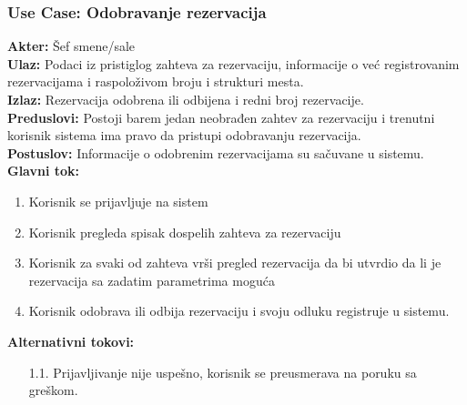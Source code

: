 \documentclass{article}
\begin{document}
\subsubsection{\textbf{Use Case}:  Odobravanje rezervacija}
\textbf{Akter:} Šef smene/sale\\
\textbf{Ulaz:} Podaci iz pristiglog zahteva za rezervaciju, informacije o već registrovanim rezervacijama i raspoloživom broju i strukturi mesta.\\
\textbf{Izlaz:} Rezervacija odobrena ili odbijena i redni broj rezervacije.\\
\textbf{Preduslovi:} Postoji barem jedan neobrađen zahtev za rezervaciju i trenutni korisnik sistema ima pravo da pristupi odobravanju rezervacija.\\
\textbf{Postuslov:} Informacije o odobrenim rezervacijama su sačuvane u sistemu.\\
\textbf{Glavni tok:}
\begin{enumerate}
\item Korisnik se prijavljuje na sistem
\item Korisnik pregleda spisak dospelih zahteva za rezervaciju
\item Korisnik za svaki od zahteva vrši pregled rezervacija da bi utvrdio da li je rezervacija sa zadatim parametrima moguća
\item Korisnik odobrava ili odbija rezervaciju i svoju odluku registruje u sistemu.\\
\end{enumerate}
\textbf{Alternativni tokovi:}\\
\begin{itemize}
\item [1.1.] Prijavljivanje nije uspešno, korisnik se preusmerava na poruku sa greškom.
\end{itemize}
\end{document}
